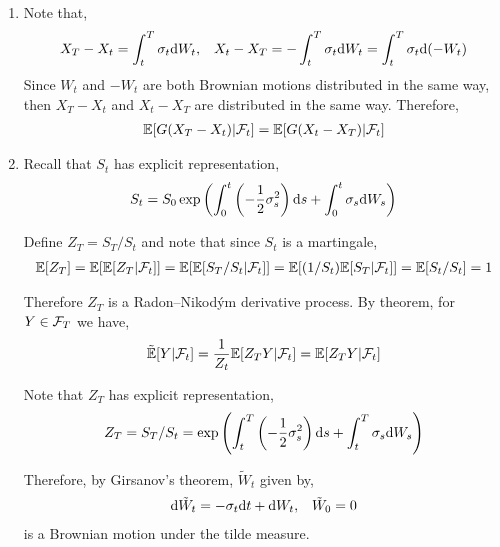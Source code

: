 \begin{solution}[Solution]
\begin{enumerate}[label=(\alph*)]
    \item Note that,
        \begin{align*}
            X_T - X_t = \int_t^T \sigma_t \mathrm{d} W_t
            , && 
            X_t - X_T = -\int_t^T \sigma_t \mathrm{d} W_t = \int_t^T \sigma_t \mathrm{d} (-W_t)
        \end{align*}
        Since \( W_t \) and \( -W_t \) are both Brownian motions distributed in the same way, then \( X_T-X_t \) and \( X_t - X_T \) are distributed in the same way. Therefore,
        \begin{align*}
            \mathbb{E}[G(X_T-X_t) | \mathcal{F}_t ] = \mathbb{E}[G(X_t-X_T) | \mathcal{F}_t]
        \end{align*}
        
    \item
        Recall that \( S_t \) has explicit representation, 
        \begin{align*}
            S_t = S_0 \exp\left(\int_0^t \left( -\frac{1}{2}\sigma_s^2 \right) \mathrm{d} s + \int_0^t \sigma_s\mathrm{d} W_s \right)
        \end{align*}

        
        Define \( Z_T = S_T/S_t \) and note that since \( S_t \) is a martingale,
        \begin{align*}
            \mathbb{E}[Z_T] = \mathbb{E}[\mathbb{E}[Z_T | \mathcal{F}_t]] = \mathbb{E}[\mathbb{E}[S_T/S_t | \mathcal{F}_t]] = \mathbb{E}[(1/S_t) \mathbb{E}[S_T|\mathcal{F}_t]] = \mathbb{E}[S_t/S_t] = 1
        \end{align*}
        
        Therefore \( Z_T \) is a Radon--Nikod\'ym derivative process. By theorem, for \( Y \in \mathcal{F}_T \) we have,
        \begin{align*}
            \tilde{\mathbb{E}}[Y  |\mathcal{F}_t] = \frac{1}{Z_t} \mathbb{E}[Z_T Y | \mathcal{F}_t] = \mathbb{E}[Z_T Y | \mathcal{F}_t]
        \end{align*}
        
        Note that \( Z_T \) has explicit representation,
        \begin{align*}
            Z_T = S_T/S_t = \exp \left( \int_t^T \left( -\frac{1}{2}\sigma_s^2 \right)\mathrm{d} s + \int_t^T \sigma_s \mathrm{d} W_s \right)
        \end{align*}

        Therefore, by Girsanov's theorem, \( \tilde{W}_t \) given by,
        \begin{align*}
            \mathrm{d} \tilde{W}_t = -\sigma_t \mathrm{d} t + \mathrm{d} W_t, && \tilde{W}_0 = 0
        \end{align*}
        is a Brownian motion under the tilde measure.
        

\end{enumerate}
\end{solution}

